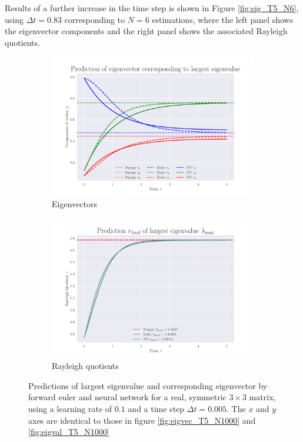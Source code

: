\documentclass[12pt]{extarticle}
\begin{document}
Results of a further increase in the time step is shown in Figure \ref{fig:eig_T5_N6}, using $\Delta t= 0.83$ corresponding to $N=6$ estimations, where the left panel shows the eigenvector components and the right panel shows the associated Rayleigh quotients. 

\begin{figure}[h]
	
	\centering
	\begin{subfigure}{0.49\textwidth}
		\centering
		\includegraphics[width=\textwidth]{../output/plots/eigvec_T5_N1000_eta01.pdf}
		\caption{Eigenvectors}
		\label{fig:eigvec_T5_N1000_eta01}
	\end{subfigure}
	\hfill
	\begin{subfigure}{0.49\textwidth}
		\centering
		\includegraphics[width=\textwidth]{../output/plots/eigval_T5_N1000_eta01.pdf}
		\caption{Rayleigh quotients}
		\label{fig:eigval_T5_N1000_eta01}
	\end{subfigure}
	\caption{Predictions of largest eigenvalue and corresponding eigenvector by forward euler and neural network for a real, symmetric $3\times 3$ matrix, using a learning rate of $0.1$ and a time step $\Delta t = 0.005$. The $x$ and $y$ axes are identical to those in figure \ref{fig:eigvec_T5_N1000} and \ref{fig:eigval_T5_N1000}}
	\label{fig:eig_T5_N1000_eta01}
\end{figure}
\end{document}
